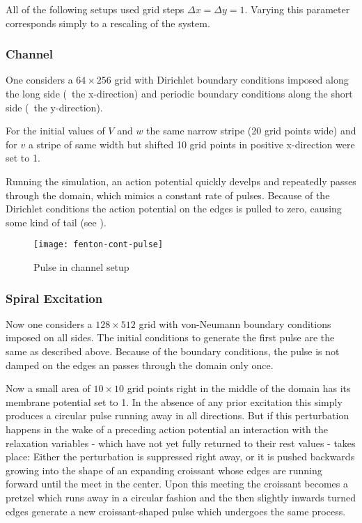 All of the following setups used grid steps $\Delta{x}=\Delta{y}=1$. Varying
this parameter corresponds simply to a rescaling of the system.


\subsubsection{Channel}
\label{sec:channel}
One considers a $64\times256$ grid with Dirichlet boundary conditions imposed
along the long side (\ie~the x-direction) and periodic boundary conditions
along the short side (\ie~the y-direction).

For the initial values of $V$ and $w$ the same narrow stripe (20 grid points
wide) and for $v$ a stripe of same width but shifted 10 grid points in positive
x-direction were set to 1.

Running the simulation, an action potential quickly develps and repeatedly
passes through the domain, which mimics a constant rate of pulses. Because of
the Dirichlet conditions the action potential on the edges is pulled to zero,
causing some kind of tail (see ).

\begin{figure}[h]
    \centering
    \texttt{[image: fenton-cont-pulse]}
    \label{fig:pulse}
    \caption{Pulse in channel setup}
\end{figure}


\subsubsection{Spiral Excitation}
\label{sec:spiral1}
Now one considers a $128\times512$ grid with von-Neumann boundary conditions
imposed on all sides. The initial conditions to generate the first pulse are
the same as described above. Because of the boundary conditions, the pulse is
not damped on the edges an passes through the domain only once.

Now a small area of $10\times10$ grid points right in the middle of the domain
has its membrane potential set to 1. In the absence of any prior excitation
this simply produces a circular pulse running away in all directions. But if
this perturbation happens in the wake of a preceding action potential an
interaction with the relaxation variables - which have not yet fully returned
to their rest values - takes place: Either the perturbation is suppressed right
away, or it is pushed backwards growing into the shape of an expanding
croissant whose edges are running forward until the meet in the
center. Upon this meeting the croissant becomes a pretzel which runs away in a
circular fashion and the then slightly inwards turned edges generate a new
croissant-shaped pulse which undergoes the same process.

